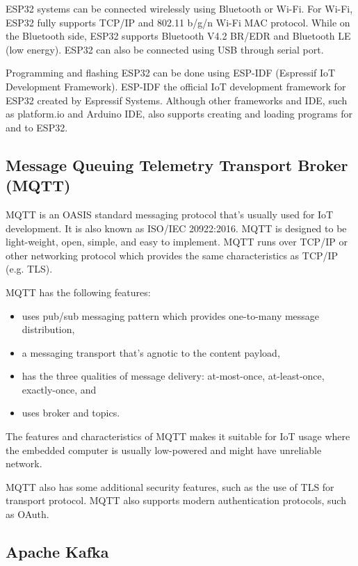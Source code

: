 ESP32 systems can be connected wirelessly using Bluetooth or Wi-Fi. For Wi-Fi,
ESP32 fully supports TCP/IP and 802.11 b/g/n Wi-Fi MAC protocol. While on the
Bluetooth side, ESP32 supports Bluetooth V4.2 BR/EDR and Bluetooth LE (low energy).
ESP32 can also be connected using USB through serial port\cite{esp32_datasheet}.

Programming and flashing ESP32 can be done using ESP-IDF (Espressif IoT
Development Framework). ESP-IDF the official IoT development framework for ESP32
created by Espressif Systems. Although other frameworks and IDE, such as
platform.io and Arduino IDE, also supports creating and loading programs for and
to ESP32.

\subsection{Message Queuing Telemetry Transport Broker (MQTT)}

MQTT is an OASIS standard messaging protocol that's usually used for IoT
development. It is also known as ISO/IEC 20922:2016. MQTT is designed to be
light-weight, open, simple, and easy to implement\cite{mqtt_iso}. MQTT runs over
TCP/IP or other networking protocol which provides the same characteristics as
TCP/IP (e.g. TLS).

MQTT has the following features:
\begin{itemize}
	\item uses pub/sub messaging pattern which provides one-to-many message
	      distribution,
	\item a messaging transport that's agnotic to the content payload,
	\item has the three qualities of message delivery: at-most-once,
	      at-least-once, exactly-once, and
	\item uses broker and topics.
\end{itemize}
The features and characteristics of MQTT makes it suitable for IoT usage
where the embedded computer is usually low-powered and might have unreliable
network.

MQTT also has some additional security features, such as the use of TLS
for transport protocol. MQTT also supports modern authentication protocols, such
as OAuth\cite{mqtt_org}.

\subsection{Apache Kafka}

